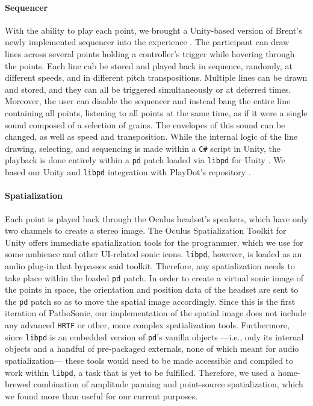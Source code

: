 \documentclass{nime-alternate}
\begin{document}
\paragraph{Sequencer}

With the ability to play each point, we brought a Unity-based version of Brent's newly implemented sequencer into the experience \cite{wbrent2019}. The participant can draw lines across several points holding a controller's trigger while hovering through the points. Each line cab be stored and played back in sequence, randomly, at different speeds, and in different pitch transpositions. Multiple lines can be drawn and stored, and they can all be triggered simultaneously or at deferred times. Moreover, the user can disable the sequencer and instead bang the entire line containing all points, listening to all points at the same time, as if it were a single sound composed of a selection of grains. The envelopes of this sound can be changed, as well as speed and transposition. While the internal logic of the line drawing, selecting, and sequencing is made within a \texttt{C\#} script in Unity, the playback is done entirely within a \texttt{pd} patch loaded via \texttt{libpd} for Unity \cite{libpd2019}. We based our Unity and \texttt{libpd} integration with PlayDot's repository \cite{playdots2019}.


\paragraph{Spatialization}

Each point is played back through the Oculus headset's speakers, which have only two channels to create a stereo image. The Oculus Spatialization Toolkit for Unity offers immediate spatialization tools for the programmer, which we use for some ambience and other UI-related sonic icons. \texttt{libpd}, however, is loaded as an audio plug-in that bypasses said toolkit. Therefore, any spatialization needs to take place within the loaded \texttt{pd} patch. In order to create a virtual sonic image of the points in space, the orientation and position data of the headset are sent to the \texttt{pd} patch so as to move the spatial image accordingly. Since this is the first iteration of PathoSonic, our implementation of the spatial image does not include any advanced \texttt{HRTF} or other, more complex spatialization tools. Furthermore, since \texttt{libpd} is an embedded version of \texttt{pd}'s vanilla objects ---i.e., only its internal objects and a handful of pre-packaged externals, none of which meant for audio spatialization--- these tools would need to be made accessible and compiled to work within \texttt{libpd}, a task that is yet to be fulfilled. Therefore, we used a home-brewed combination of amplitude panning and point-source spatialization, which we found more than useful for our current purposes.
\end{document}
